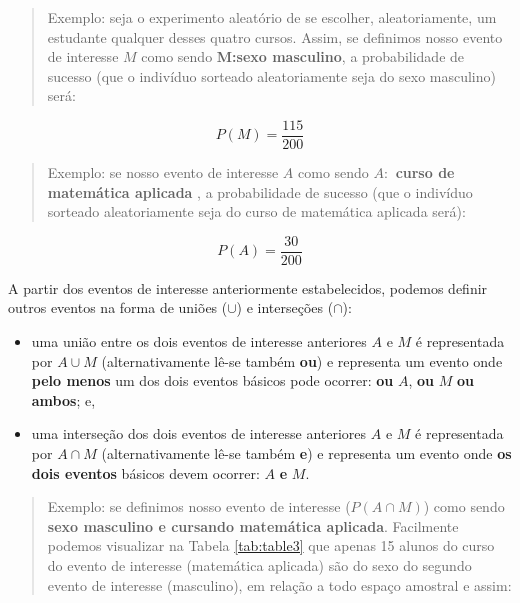 \documentclass[
]{book}
\providecommand{\tightlist}{%
  \setlength{\itemsep}{0pt}\setlength{\parskip}{0pt}}
\begin{document}
\begin{quote}
Exemplo: seja o experimento aleatório de se escolher, aleatoriamente, um estudante qualquer desses quatro cursos. Assim, se definimos nosso evento de interesse \(M\) como sendo \textbf{M:sexo masculino}, a probabilidade de sucesso (que o indivíduo sorteado aleatoriamente seja do sexo masculino) será:
\end{quote}

\hfill\break

\[
P(M) = \frac{115}{200}
\]

\hfill\break

\begin{quote}
Exemplo: se nosso evento de interesse \(A\) como sendo \textbf{\(A:\) curso de matemática aplicada} , a probabilidade de sucesso (que o indivíduo sorteado aleatoriamente seja do curso de matemática aplicada será):
\end{quote}

\[
P(A) = \frac{30}{200}
\]

\hfill\break

A partir dos eventos de interesse anteriormente estabelecidos, podemos definir outros eventos na forma de uniões (\(\cup\)) e interseções (\(\cap\)):

\hfill\break

\begin{itemize}
\tightlist
\item
  uma união entre os dois eventos de interesse anteriores \(A\) e \(M\) é representada por \(A \cup M\) (alternativamente lê-se também \textbf{ou}) e representa um evento onde \textbf{pelo menos} um dos dois eventos básicos pode ocorrer: \textbf{ou} \(A\), \textbf{ou} \(M\) \textbf{ou ambos}; e,\\
\item
  uma interseção dos dois eventos de interesse anteriores \(A\) e \(M\) é representada por \(A \cap M\) (alternativamente lê-se também \textbf{e}) e representa um evento onde \textbf{os dois eventos} básicos devem ocorrer: \(A\) \textbf{e} \(M\).
\end{itemize}

\hfill\break

\begin{quote}
Exemplo: se definimos nosso evento de interesse (\(P(A \cap M)\)) como sendo \textbf{sexo masculino e cursando matemática aplicada}. Facilmente podemos visualizar na Tabela \ref{tab:table3} que apenas 15 alunos do curso do evento de interesse (matemática aplicada) são do sexo do segundo evento de interesse (masculino), em relação a todo espaço amostral e assim:
\end{quote}
\end{document}
